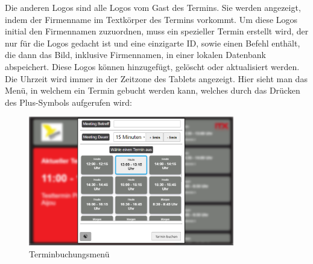 \newline
Die anderen Logos sind alle Logos vom Gast des Termins.
Sie werden angezeigt, indem der Firmenname im Textkörper des Termins vorkommt.
Um diese Logos initial den Firmennamen zuzuordnen, muss ein spezieller Termin erstellt wird, der nur für die Logos gedacht ist und eine einzigarte ID, sowie einen Befehl enthält, die dann das Bild, inklusive Firmennamen, in einer lokalen Datenbank abspeichert.
Diese Logos können hinzugefügt, gelöscht oder aktualisiert werden.
\newline
Die Uhrzeit wird immer in der Zeitzone des Tablets angezeigt.
\newline
\newline
Hier sieht man das Menü, in welchem ein Termin gebucht werden kann, welches durch das Drücken des Plus-Symbols aufgerufen wird:
\begin{figure}[h]
\par\vspace{1cm}
    \centering
    \includegraphics[width=0.8\textwidth]{Bilder/Ergebnis_TerminErstellen_Menue}
    \caption{Terminbuchungsmenü}
    \label{fig:Menue}
\par\vspace{1cm}
\end{figure}
\justifying
\pagebreak

